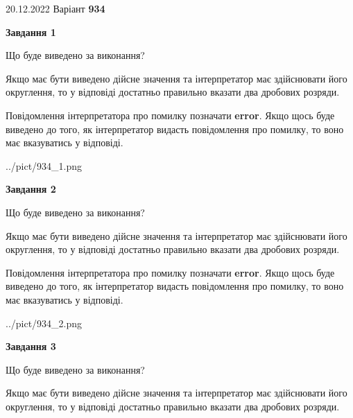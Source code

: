 \documentclass[12pt, ukrainian]{article}
\begin{document}
{20.12.2022 Варіант \No \textbf { 934 }\par}
{
\begin {Large}

{\begin {center}\textbf{Завдання 1}\end {center}}\par
Що буде виведено за виконання? \par

Якщо має бути виведено дійсне значення та інтерпретатор має здійснювати його округлення, 
то у відповіді достатньо правильно вказати два дробових розряди.

Повідомлення інтерпретатора про помилку позначати \textbf{error}.
Якщо щось буде виведено до того, як інтерпретатор видасть повідомлення про помилку, 
то воно має вказуватись у відповіді. \par

\begin{center}
	{../pict/934_1.png}
\end{center}
\newpage

{\begin {center}\textbf{Завдання 2}\end {center}}\par
Що буде виведено за виконання? \par

Якщо має бути виведено дійсне значення та інтерпретатор має здійснювати його округлення, 
то у відповіді достатньо правильно вказати два дробових розряди.

Повідомлення інтерпретатора про помилку позначати \textbf{error}.
Якщо щось буде виведено до того, як інтерпретатор видасть повідомлення про помилку, 
то воно має вказуватись у відповіді. \par

\begin{center}
	{../pict/934_2.png}
\end{center}
\newpage

{\begin {center}\textbf{Завдання 3}\end {center}}\par
Що буде виведено за виконання? \par

Якщо має бути виведено дійсне значення та інтерпретатор має здійснювати його округлення, 
то у відповіді достатньо правильно вказати два дробових розряди.


\end{Large}}
\end{document}

